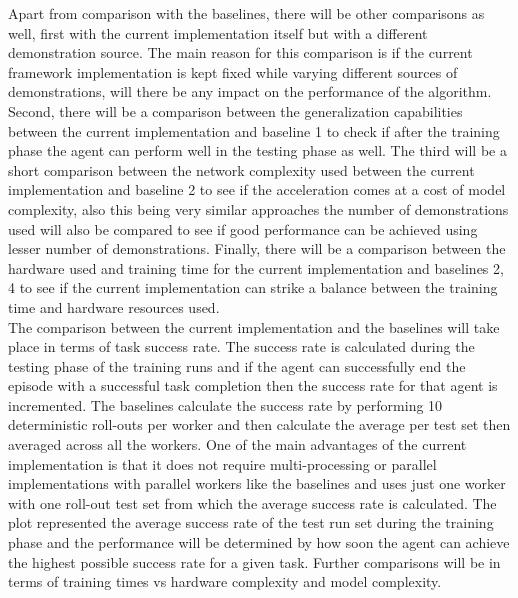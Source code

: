 Apart from comparison with the baselines, there will be other comparisons as well, first with the current implementation itself but with a different demonstration source. The main reason for this comparison is if the current framework implementation is kept fixed while varying different sources of demonstrations, will there be any impact on the performance of the algorithm. Second, there will be a comparison between the generalization capabilities between the current implementation and baseline 1 to check if after the training phase the agent can perform well in the testing phase as well. The third will be a short comparison between the network complexity used between the current implementation and baseline 2 to see if the acceleration comes at a cost of model complexity, also this being very similar approaches the number of demonstrations used will also be compared to see if good performance can be achieved using lesser number of demonstrations. Finally, there will be a comparison between the hardware used and training time for the current implementation and baselines 2, 4 to see if the current implementation can strike a balance between the training time and hardware resources used. \\

The comparison between the current implementation and the baselines will take place in terms of task success rate. The success rate is calculated during the testing phase of the training runs and if the agent can successfully end the episode with a successful task completion then the success rate for that agent is incremented. The baselines calculate the success rate by performing 10 deterministic roll-outs per worker and then calculate the average per test set then averaged across all the workers. One of the main advantages of the current implementation is that it does not require multi-processing or parallel implementations with parallel workers like the baselines and uses just one worker with one roll-out test set from which the average success rate is calculated. The plot represented the average success rate of the test run set during the training phase and the performance will be determined by how soon the agent can achieve the highest possible success rate for a given task. Further comparisons will be in terms of training times vs hardware complexity and model complexity. \\

